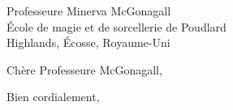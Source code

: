 \documentclass[10pt,language=english]{CPPMLetter}
\begin{document}
\BgThispage
\begin{letter}{
    Professeure Minerva McGonagall\\ 
    École de magie et de sorcellerie de Poudlard\\ 
    Highlands, Écosse, Royaume-Uni
}

\opening{Chère Professeure McGonagall,}

\lipsum[1-14]

\closing{Bien cordialement,}
\end{letter}
\end{document}
